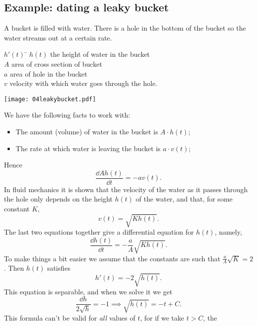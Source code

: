 \medskip

\subsection{Example: dating a leaky bucket} %
\label{ex:leakybucket}
A bucket is filled with water.  There is a hole in the bottom of the bucket so the
water streams out at a certain rate.

\smallskip

\begin{center}
  \begin{minipage}[c]{2.5in}
    \begin{tabbing}
      $h'(t)$ \= \hfill\kill
      $h(t)$ \> the height of water in the bucket \\
      $A$    \> area of cross section of bucket \\
      $a$    \> area of hole in the bucket \\
      $v$    \> velocity with which water goes through the hole. 
    \end{tabbing}
  \end{minipage}\quad
  \begin{minipage}[c]{1in}
    \texttt{[image: 04leakybucket.pdf]}
  \end{minipage}
\end{center}
\noindent
We have the following facts to work with:
\begin{itemize}
\item  The amount (volume) of water in the bucket is $A\cdot h(t)$;
\item  The rate at which water is leaving the bucket is $a\cdot v(t)$;
\end{itemize}
Hence
\[
\frac{\dd Ah(t)}{\dd t} = - a v (t).
\]
In fluid mechanics it is shown that the velocity of the water as it passes through
the hole only depends on the height $h(t)$ of the water, and that, for some constant
$K$,
\[
v (t) = \sqrt{Kh(t)}.
\]
The last two equations together give a differential equation for $h (t)$, namely,
\[
\frac{\dd h(t)}{\dd t} = -\frac aA\sqrt{Kh(t)}.
\]
To make things a bit easier we assume that the constants are such that $\frac aA\sqrt
K=2$. Then $h (t)$ satisfies
\begin{equation}
  \label{eq:leaky-bucket}
  h'(t) = -2\sqrt{ h (t)}.
\end{equation}
This equation is separable, and when we solve it we get
\[
\frac{\dd h}{2\sqrt h} = - 1 \implies \sqrt{h(t)} = - t+C.
\]
This formula can't be valid for \textit{all} values of $t$, for if we take $t>C$, the
